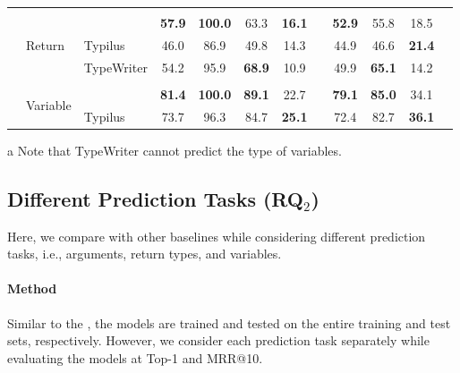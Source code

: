 \begin{table}[!t]
\begin{threeparttable}
{\begin{tabular}{@{}l l l c c c c c c c c c @{}}
			& & & & & & & & & & &  \\
			& \multirow{3}{*}{Return}  & \name & \textbf{57.9} & \textbf{100.0} & 63.3 & \textbf{16.1} & & \textbf{52.9} & 55.8 & 18.5 & \\
			& & Typilus  & 46.0 & 86.9 & 49.8 & 14.3 & & 44.9 & 46.6 & \textbf{21.4} & \\
			& & TypeWriter  & 54.2 & 95.9 & \textbf{68.9} & 10.9 & & 49.9 & \textbf{65.1} & 14.2 & \\
			& & & & & & & & & & & \\
			& \multirow{2}{*}{Variable\tnote{a}}  & \name & \textbf{81.4} & \textbf{100.0} & \textbf{89.1} & 22.7 & & \textbf{79.1} & \textbf{85.0} & 34.1 & \\
			& & Typilus & 73.7 & 96.3 & 84.7 & \textbf{25.1} & & 72.4 & 82.7 & \textbf{36.1} & \\
			\bottomrule
		\end{tabular}}
		\begin{tablenotes}
			\item[a] {\footnotesize Note that TypeWriter cannot predict the type of variables.}
		\end{tablenotes}
	\end{threeparttable}
\end{table}

\subsection{Different Prediction Tasks (\textbf{RQ}$_{2}$)}
Here, we compare \name with other baselines while considering different prediction tasks, i.e., arguments, return types, and variables.

\paragraph{Method}
Similar to the , the models are trained and tested on the entire training and test sets, respectively.
However, we consider each prediction task separately while evaluating the models at Top-1 and MRR@10.

